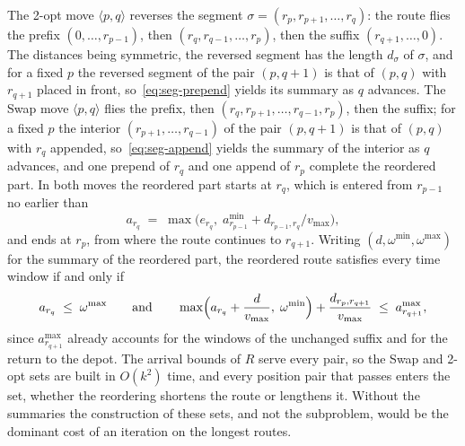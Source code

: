 \documentclass[11pt]{article}
\begin{document}
The 2-opt move $\langle p, q \rangle$ reverses the segment $\sigma = (r_p, r_{p+1}, \ldots, r_q)$: the route flies the prefix $(0, \ldots, r_{p-1})$, then $(r_q, r_{q-1}, \ldots, r_p)$, then the suffix $(r_{q+1}, \ldots, 0)$. The distances being symmetric, the reversed segment has the length $d_\sigma$ of $\sigma$, and for a fixed $p$ the reversed segment of the pair $(p, q+1)$ is that of $(p, q)$ with $r_{q+1}$ placed in front, so~\eqref{eq:seg-prepend} yields its summary as $q$ advances. The Swap move $\langle p, q \rangle$ flies the prefix, then $(r_q, r_{p+1}, \ldots, r_{q-1}, r_p)$, then the suffix; for a fixed $p$ the interior $(r_{p+1}, \ldots, r_{q-1})$ of the pair $(p, q+1)$ is that of $(p, q)$ with $r_q$ appended, so~\eqref{eq:seg-append} yields the summary of the interior as $q$ advances, and one prepend of $r_q$ and one append of $r_p$ complete the reordered part. In both moves the reordered part starts at $r_q$, which is entered from $r_{p-1}$ no earlier than
\begin{equation}\label{eq:reorder-entry}
    a_{r_q} \;=\; \max\bigl( e_{r_q},\; a^{\min}_{r_{p-1}} + d_{r_{p-1}, r_q} / v_{\max} \bigr),
\end{equation}
and ends at $r_p$, from where the route continues to $r_{q+1}$. Writing $(d, \omega^{\min}, \omega^{\max})$ for the summary of the reordered part, the reordered route satisfies every time window if and only if
\begin{equation}\label{eq:reorder-test}
    a_{r_q} \;\le\; \omega^{\max}
    \qquad \text{and} \qquad
    \max\Bigl( a_{r_q} + \frac{d}{v_{\max}},\; \omega^{\min} \Bigr) + \frac{d_{r_p, r_{q+1}}}{v_{\max}} \;\le\; a^{\max}_{r_{q+1}},
\end{equation}
since $a^{\max}_{r_{q+1}}$ already accounts for the windows of the unchanged suffix and for the return to the depot. The arrival bounds of $R$ serve every pair, so the Swap and 2-opt sets are built in $O(k^2)$ time, and every position pair that passes enters the set, whether the reordering shortens the route or lengthens it. Without the summaries the construction of these sets, and not the subproblem, would be the dominant cost of an iteration on the longest routes.
\end{document}
